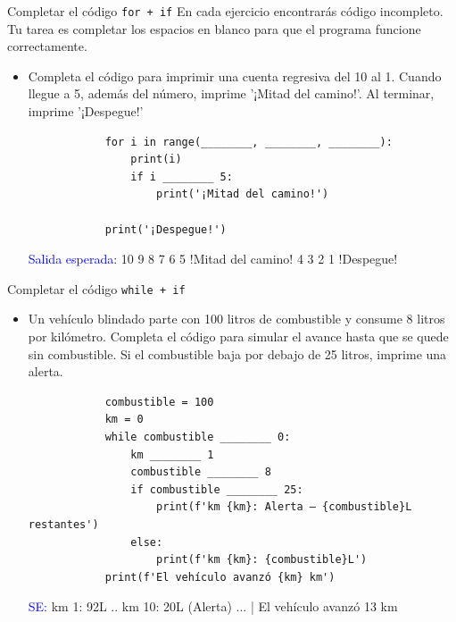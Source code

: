 \documentclass{beamer}
\begin{document}
    \begin{frame}[fragile, t]{Completar el código \texttt{for + if}}
        En cada ejercicio encontrarás código incompleto. Tu tarea es completar los espacios en blanco para que el programa funcione correctamente.
        \begin{itemize}
            \item Completa el código para imprimir una cuenta regresiva del 10 al 1. Cuando llegue a 5, además del número, imprime '¡Mitad del camino!'. Al terminar, imprime '¡Despegue!'
            \begin{verbatim}
            for i in range(________, ________, ________):
                print(i)
                if i ________ 5:
                    print('¡Mitad del camino!')
            
            print('¡Despegue!')
            \end{verbatim}
            \textcolor{blue}{Salida esperada}: 10 9 8 7 6 5 !Mitad del camino! 4 3 2 1 !Despegue!
        \end{itemize}
    \end{frame}

    \begin{frame}[fragile,t]{Completar el código \texttt{while + if}}
        \begin{itemize}
            \item Un vehículo blindado parte con 100 litros de combustible y consume 8 litros por kilómetro. Completa el código para simular el avance hasta que se quede sin combustible. Si el combustible baja por debajo de 25 litros, imprime una alerta.
            \begin{verbatim}
            combustible = 100
            km = 0
            while combustible ________ 0:
                km ________ 1
                combustible ________ 8
                if combustible ________ 25:
                    print(f'km {km}: Alerta — {combustible}L restantes')
                else:
                    print(f'km {km}: {combustible}L')
            print(f'El vehículo avanzó {km} km')
            \end{verbatim}
            \textcolor{blue}{SE:} km 1: 92L .. km 10: 20L (Alerta)  ... |  El vehículo avanzó 13 km
        \end{itemize}
    \end{frame}
\end{document}
